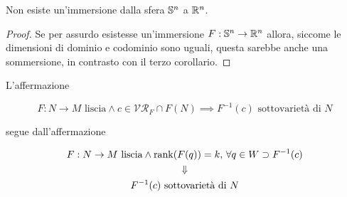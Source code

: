 \begin{corollary}[4]\label{imm_sph}
	Non esiste un'immersione dalla sfera $ \S^{n} $ a $ \R^{n} $.
\end{corollary}

\begin{proof}
	Se per assurdo esistesse un'immersione $ F : \S^{n} \to \R^{n} $ allora, siccome le dimensioni di dominio e codominio sono uguali, questa sarebbe anche una sommersione, in contrasto con il terzo corollario.
\end{proof}

\begin{remark}
	L'affermazione
	
	\begin{equation}
		F : N \to M \text{ liscia} \wedge c \in \mathcal{VR}_{F} \cap F(N) \implies F^{-1}(c) \text{ sottovarietà di } N
	\end{equation}

	segue dall'affermazione
	
	\begin{gather}
		F : N \to M \text{ liscia} \wedge \rank(F(q)) = k, \, \forall q \in W \supset F^{-1}(c)\nonumber\\
		\Downarrow\\
		F^{-1}(c) \text{ sottovarietà di } N\nonumber
	\end{gather}
\end{remark}

